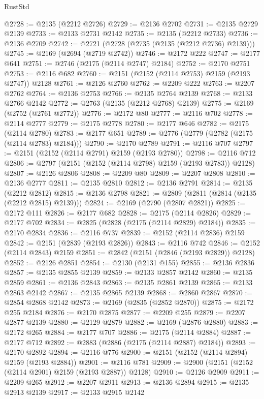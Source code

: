 \begin{lexlean}{RustStd}
\begin{coremodule}
{\begin{coremodule}
{{{{{{{{{{{{{{{{@2728 := @2135 (@2212 @2726)
@2729 := @2136 @2702
@2731 := @2135 @2729 @2139
@2733 := @2133 @2731 @2142
@2735 := @2135 (@2212 @2733)
@2736 := @2136 @2709
@2742 := @2721 (@2728 (@2735 (@2135 (@2212 @2736) @2139)))
@2745 := @2169 (@2694 (@2719 @2742))
@2746 := @2172 @222
@2747 := @2177 @641
@2751 := @2746 (@2175 (@2114 @2747) @2184)
@2752 := @2170 @2751
@2753 := @2116 @682
@2760 := @2151 (@2152 (@2114 @2753) @2159 (@2193 @2747)) @2128
@2761 := @2126 @2760
@2762 := @2209 @222
@2763 := @2207 @2762
@2764 := @2136 @2753
@2766 := @2135 @2764 @2139
@2768 := @2133 @2766 @2142
@2772 := @2763 (@2135 (@2212 @2768) @2139)
@2775 := @2169 (@2752 (@2761 @2772))
@2776 := @2172 @80
@2777 := @2116 @702
@2778 := @2114 @2777
@2779 := @2175 @2778
@2780 := @2177 @646
@2782 := @2175 (@2114 @2780)
@2783 := @2177 @651
@2789 := @2776 (@2779 (@2782 (@2175 (@2114 @2783) @2184)))
@2790 := @2170 @2789
@2791 := @2116 @707
@2797 := @2151 (@2152 (@2114 @2791) @2159 (@2193 @2780))
@2798 := @2116 @712
@2806 := @2797 (@2151 (@2152 (@2114 @2798) @2159 (@2193 @2783)) @2128)
@2807 := @2126 @2806
@2808 := @2209 @80
@2809 := @2207 @2808
@2810 := @2136 @2777
@2811 := @2135 @2810
@2812 := @2136 @2791
@2814 := @2135 (@2212 @2812)
@2815 := @2136 @2798
@2821 := @2809 (@2811 (@2814 (@2135 (@2212 @2815) @2139)))
@2824 := @2169 (@2790 (@2807 @2821))
@2825 := @2172 @111
@2826 := @2177 @682
@2828 := @2175 (@2114 @2826)
@2829 := @2177 @702
@2834 := @2825 (@2828 (@2175 (@2114 @2829) @2184))
@2835 := @2170 @2834
@2836 := @2116 @737
@2839 := @2152 (@2114 @2836) @2159
@2842 := @2151 (@2839 (@2193 @2826))
@2843 := @2116 @742
@2846 := @2152 (@2114 @2843) @2159
@2851 := @2842 (@2151 (@2846 (@2193 @2829)) @2128)
@2852 := @2126 @2851
@2854 := @2130 (@2131 @155)
@2855 := @2136 @2836
@2857 := @2135 @2855 @2139
@2859 := @2133 @2857 @2142
@2860 := @2135 @2859
@2861 := @2136 @2843
@2863 := @2135 @2861 @2139
@2865 := @2133 @2863 @2142
@2867 := @2135 @2865 @2139
@2868 := @2860 @2867
@2870 := @2854 @2868 @2142
@2873 := @2169 (@2835 (@2852 @2870))
@2875 := @2172 @255 @2184
@2876 := @2170 @2875
@2877 := @2209 @255
@2879 := @2207 @2877 @2139
@2880 := @2129 @2879
@2882 := @2169 (@2876 @2880)
@2883 := @2172 @265
@2884 := @2177 @707
@2886 := @2175 (@2114 @2884)
@2887 := @2177 @712
@2892 := @2883 (@2886 (@2175 (@2114 @2887) @2184))
@2893 := @2170 @2892
@2894 := @2116 @776
@2900 := @2151 (@2152 (@2114 @2894) @2159 (@2193 @2884))
@2901 := @2116 @781
@2909 := @2900 (@2151 (@2152 (@2114 @2901) @2159 (@2193 @2887)) @2128)
@2910 := @2126 @2909
@2911 := @2209 @265
@2912 := @2207 @2911
@2913 := @2136 @2894
@2915 := @2135 @2913 @2139
@2917 := @2133 @2915 @2142
}}}}}}}}}}}}}}}}
\end{coremodule}}
\end{coremodule}
\end{lexlean}
